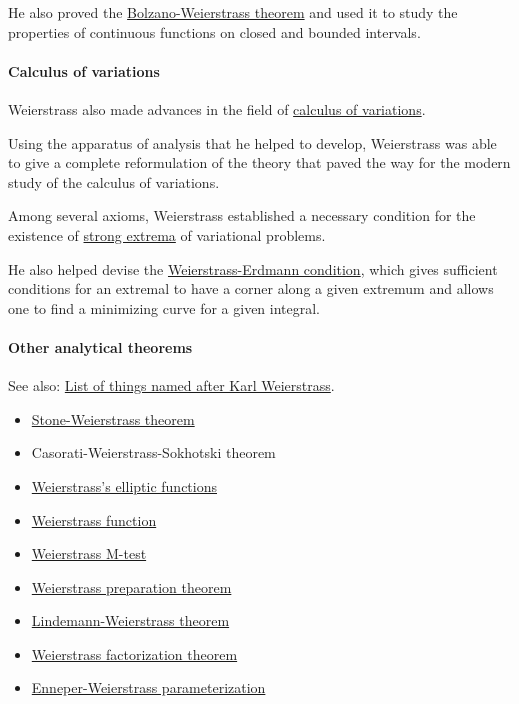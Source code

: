 \documentclass{article}
\begin{document}
He also proved the \href{https://en.wikipedia.org/wiki/Bolzano-Weierstrass_theorem}{Bolzano-Weierstrass theorem} and used it to study the properties of continuous functions on closed and bounded intervals.

\paragraph{Calculus of variations}
Weierstrass also made advances in the field of \href{https://en.wikipedia.org/wiki/Calculus_of_variations}{calculus of variations}.

Using the apparatus of analysis that he helped to develop, Weierstrass was able to give a complete reformulation of the theory that paved the way for the modern study of the calculus of variations.

Among several axioms, Weierstrass established a necessary condition for the existence of \href{https://en.wikipedia.org/wiki/Strong_extrema}{strong extrema} of variational problems.

He also helped devise the \href{https://en.wikipedia.org/wiki/Weierstrass-Erdmann_condition}{Weierstrass-Erdmann condition}, which gives sufficient conditions for an extremal to have a corner along a given extremum and allows one to find a minimizing curve for a given integral.

\paragraph{Other analytical theorems}
See also: \href{https://en.wikipedia.org/wiki/List_of_things_named_after_Karl_Weierstrass}{List of things named after Karl Weierstrass}.
\begin{itemize}
	\item \href{https://en.wikipedia.org/wiki/Stone-Weierstrass_theorem}{Stone-Weierstrass theorem}
	\item Casorati-Weierstrass-Sokhotski theorem
	\item \href{https://en.wikipedia.org/wiki/Weierstrass's_elliptic_functions}{Weierstrass's elliptic functions}
	\item \href{https://en.wikipedia.org/wiki/Weierstrass\_function}{Weierstrass function}
	\item \href{https://en.wikipedia.org/wiki/Weierstrass_M-test}{Weierstrass M-test}
	\item \href{https://en.wikipedia.org/wiki/Weierstrass_preparation_theorem}{Weierstrass preparation theorem}
	\item \href{https://en.wikipedia.org/wiki/Lindemann-Weierstrass_theorem}{Lindemann-Weierstrass theorem}
	\item \href{https://en.wikipedia.org/wiki/Weierstrass_factorization_theorem}{Weierstrass factorization theorem}
	\item \href{https://en.wikipedia.org/wiki/Enneper-Weierstrass_parameterization}{Enneper-Weierstrass parameterization}
\end{itemize}
\end{document}
